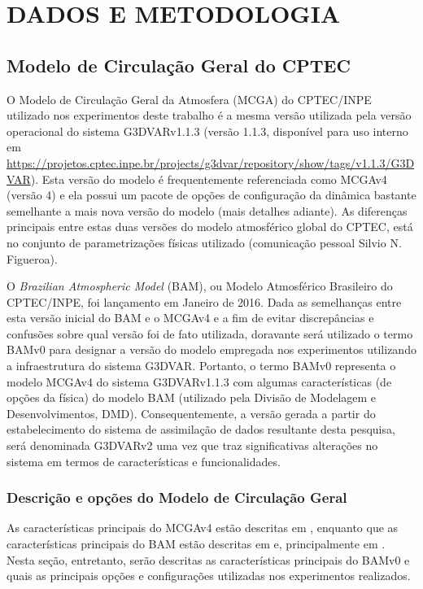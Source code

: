 \chapter{DADOS E METODOLOGIA}  
\label{cap:dados_metodologias}

\section{Modelo de Circulação Geral do CPTEC}
\label{sec:mcga}

O Modelo de Circulação Geral da Atmosfera (MCGA) do CPTEC/INPE utilizado nos experimentos deste trabalho é a mesma versão utilizada pela versão operacional do sistema G3DVARv1.1.3 (versão 1.1.3, disponível para uso interno em \url{https://projetos.cptec.inpe.br/projects/g3dvar/repository/show/tags/v1.1.3/G3DVAR}). Esta versão do modelo é frequentemente referenciada como MCGAv4 (versão 4) e ela possui um pacote de opções de configuração da dinâmica bastante semelhante a mais nova versão do modelo (mais detalhes adiante). As diferenças principais entre estas duas versões do modelo atmosférico global do CPTEC, está no conjunto de parametrizações físicas utilizado (comunicação pessoal Silvio N. Figueroa).

O \textit{Brazilian Atmospheric Model} (BAM), ou Modelo Atmosférico Brasileiro do CPTEC/INPE, foi lançamento em Janeiro de 2016. Dada as semelhanças entre esta versão inicial do BAM e o MCGAv4 e a fim de evitar discrepâncias e confusões sobre qual versão foi de fato utilizada, doravante será utilizado o termo BAMv0 para designar a versão do modelo empregada nos experimentos utilizando a infraestrutura do sistema G3DVAR. Portanto, o termo BAMv0 representa o modelo MCGAv4 do sistema G3DVARv1.1.3 com algumas características (de opções da física) do modelo BAM (utilizado pela Divisão de Modelagem e Desenvolvimentos, DMD). Consequentemente, a versão gerada a partir do estabelecimento do sistema de assimilação de dados resultante desta pesquisa, será denominada G3DVARv2 uma vez que traz significativas alterações no sistema em termos de características e funcionalidades.

\subsection{Descrição e opções do Modelo de Circulação Geral}

As características principais do MCGAv4 estão descritas em , enquanto que as características principais do BAM estão descritas em  e, principalmente em . Nesta seção, entretanto, serão descritas as características principais do BAMv0 e quais as principais opções e configurações utilizadas nos experimentos realizados. 

